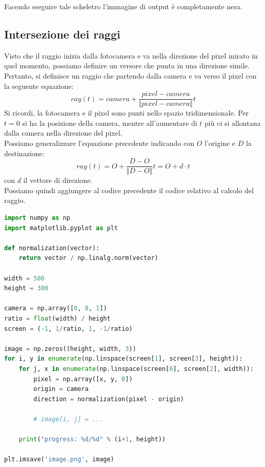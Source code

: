 \documentclass[9pt,a4paper,twoside]{tau}
\begin{document}
Facendo eseguire tale scheletro l'immagine di output è completamente nera.

\subsection{Intersezione dei raggi}
Visto che il raggio inizia dalla fotocamera e va nella direzione del pixel mirato in quel momento, possiamo definire un versore che punta in una direzione simile. Pertanto, si definisce un raggio che partendo dalla camera e va verso il pixel con la seguente equazione:
\begin{equation*}
	ray(t) = camera + \frac{pixel - camera}{\Vert pixel - camera \Vert} t
\end{equation*}
Si ricordi, la fotocamera e il pixel sono punti nello spazio tridimensionale. Per $t=0$ si ha la posizione della camera, mentre all'aumentare di $t$ più ci si allontana dalla camera nella direzione del pixel.\\
Possiamo generalizzare l'equazione precedente indicando con $O$ l'origine e $D$ la destinazione:
\begin{equation*}
	ray(t) = O + \frac{D - O}{\Vert D -O \Vert} t = O + d\cdot t
\end{equation*} 
con $d$ il vettore di direzione.\\

Possiamo quindi aggiungere al codice precedente il codice relativo al calcolo del raggio.
\begin{lstlisting}[language=Python]
import numpy as np
import matplotlib.pyplot as plt

def normalization(vector):
    return vector / np.linalg.norm(vector)

width = 500
height = 300

camera = np.array([0, 0, 1])
ratio = float(width) / height
screen = (-1, 1/ratio, 1, -1/ratio)     

image = np.zeros((height, width, 3))
for i, y in enumerate(np.linspace(screen[1], screen[3], height)):
    for j, x in enumerate(np.linspace(screen[0], screen[2], width)):
        pixel = np.array([x, y, 0])
        origin = camera
        direction = normalization(pixel - origin)

        # image[i, j] = ...
        
    print("progress: %d/%d" % (i+1, height))
    
plt.imsave('image.png', image)
\end{lstlisting}
\end{document}
